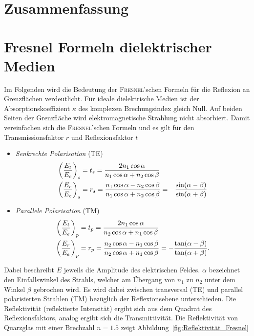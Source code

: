 \documentclass[a4paper,twoside,final]{article}
\begin{document}
\section{Zusammenfassung}

\appendix
\section{Fresnel Formeln dielektrischer Medien}
Im Folgenden wird die Bedeutung der \textsc{Fresnel}'schen Formeln für die Reflexion an Grenzflächen verdeutlicht. Für ideale dielektrische Medien ist der Absorptionskoeffizient $\kappa$ des komplexen Brechungsindex gleich Null. Auf beiden Seiten der Grenzfläche wird elektromagnetische Strahlung nicht absorbiert. Damit vereinfachen sich die \textsc{Fresnel}'schen Formeln und es gilt für den Transmissionsfaktor $r$ und Reflexionsfaktor $t$~\cite{Demtröder2}
\begin{itemize}
  \item \emph{Senkrechte Polarisation} (TE)
  \begin{align}
    \qty(\frac{E_t}{E_e})_s &= t_s = \frac{2 n_1 \cos \alpha}{n_1 \cos\alpha + n_2 \cos \beta}\\
    \qty(\frac{E_r}{E_e})_s &= r_s = \frac{n_1 \cos\alpha - n_2 \cos\beta}{n_1 \cos\alpha + n_2 \cos \beta} = -\frac{\sin(\alpha -\beta)}{\sin(\alpha + \beta)}
  \end{align}
  \item \emph{Parallele Polarisation} (TM)
  \begin{align}
    \qty(\frac{E_t}{E_e})_p &= t_p = \frac{2 n_1 \cos \alpha}{n_2 \cos\alpha + n_1 \cos \beta}\\
    \qty(\frac{E_r}{E_e})_p &= r_p = \frac{n_2 \cos\alpha - n_1 \cos\beta}{n_2 \cos\alpha + n_1 \cos \beta} = -\frac{\tan(\alpha -\beta)}{\tan(\alpha + \beta)}.\label{eqn:Parallele_Polarisation}
  \end{align}
\end{itemize}
Dabei beschreibt $E$ jeweils die Amplitude des elektrischen Feldes. $\alpha$ bezeichnet den Einfallswinkel des Strahls, welcher am Übergang von $n_1$ zu $n_2$ unter dem Winkel $\beta$ gebrochen wird.
Es wird dabei zwischen transversal (TE) und parallel polarisierten Strahlen (TM) bezüglich der Reflexionsebene unterschieden. Die Reflektivität (reflektierte Intensität) ergibt sich aus dem Quadrat des Reflexionsfaktors, analog ergibt sich die Transmittivität. Die Reflektivität von Quarzglas mit einer Brechzahl $n = 1.5$ zeigt Abbildung~\ref{fig:Reflektivität_Fresnel}
\end{document}

